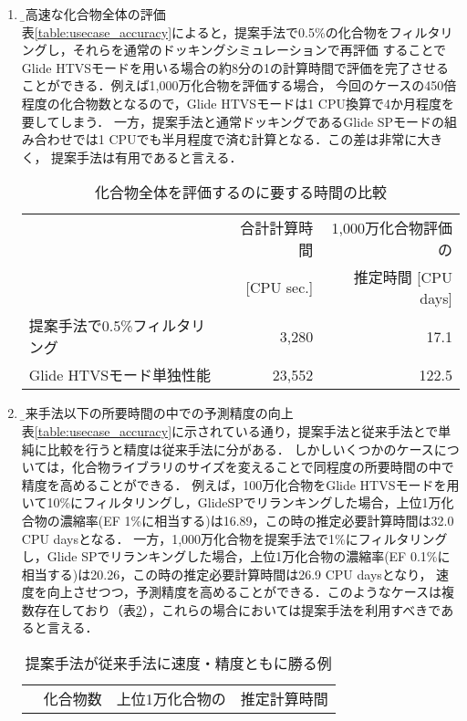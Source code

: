 \begin{enumerate}
\item \b{超高速な化合物全体の評価}\\
	表\ref{table:usecase_accuracy}によると，提案手法で0.5\%の化合物をフィルタリングし，それらを通常のドッキングシミュレーションで再評価
	することでGlide HTVSモードを用いる場合の約8分の1の計算時間で評価を完了させることができる．例えば1,000万化合物を評価する場合，
	今回のケースの450倍程度の化合物数となるので，Glide HTVSモードは1 CPU換算で4か月程度を要してしまう．
	一方，提案手法と通常ドッキングであるGlide SPモードの組み合わせでは1 CPUでも半月程度で済む計算となる．この差は非常に大きく，
	提案手法は有用であると言える．
\begin{table}[htbp] \centering
	\caption{化合物全体を評価するのに要する時間の比較}
	\label{calc_speed_ultrafast}
	\begin{tabular}{l|rr}
	\hline
												&合計計算時間	&1,000万化合物評価の		\\ 
												&[CPU sec.]		&推定時間 [CPU days]		\\ \hline
	提案手法で0.5\%フィルタリング	&3,280				&17.1								\\
	Glide HTVSモード単独性能		&23,552				&122.5								\\ \hline
	\end{tabular}
\end{table}
\item \b{従来手法以下の所要時間の中での予測精度の向上}\\
	表\ref{table:usecase_accuracy}に示されている通り，提案手法と従来手法とで単純に比較を行うと精度は従来手法に分がある．
	しかしいくつかのケースについては，化合物ライブラリのサイズを変えることで同程度の所要時間の中で精度を高めることができる．
	例えば，100万化合物をGlide HTVSモードを用いて10\%にフィルタリングし，GlideSPでリランキングした場合，上位1万化合物の濃縮率(EF 1\%に相当する)は16.89，この時の推定必要計算時間は32.0 CPU daysとなる．
	一方，1,000万化合物を提案手法で1\%にフィルタリングし，Glide SPでリランキングした場合，上位1万化合物の濃縮率(EF 0.1\%に相当する)は20.26，この時の推定必要計算時間は26.9 CPU daysとなり，
	速度を向上させつつ，予測精度を高めることができる．このようなケースは複数存在しており（表\ref{table:win_proposal_case}），これらの場合においては提案手法を利用すべきであると言える．
\begin{table}[htbp] \centering
	\caption{提案手法が従来手法に速度・精度ともに勝る例}
	\label{table:win_proposal_case}
	\begin{tabular}{l|rrr}
	\hline
												&\multirow{2}{*}{化合物数}	&上位1万化合物の		&推定計算時間	\\

\end{tabular}
\end{table}
\end{enumerate}
